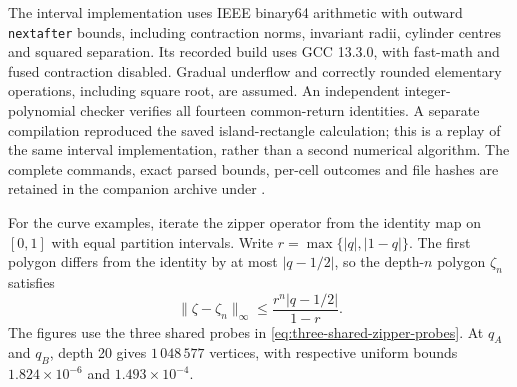The interval implementation uses IEEE binary64 arithmetic with outward
\texttt{nextafter} bounds, including contraction norms, invariant radii,
cylinder centres and squared separation. Its recorded build uses GCC
13.3.0, with fast-math and fused contraction disabled. Gradual underflow
and correctly rounded elementary operations, including square root, are
assumed. An independent integer-polynomial checker verifies all fourteen
common-return identities. A separate compilation reproduced the saved
island-rectangle calculation; this is a replay of the same interval
implementation, rather than a second numerical algorithm. The complete commands, exact parsed bounds, per-cell outcomes and file hashes are retained in the companion archive under
.

For the curve examples, iterate the zipper operator from the identity
map on $[0,1]$ with equal partition intervals. Write
$r=\max\{|q|,|1-q|\}$. The first polygon differs from the identity by at
most $|q-1/2|$, so the depth-$n$ polygon $\zeta_n$ satisfies
\[
 \|\zeta-\zeta_n\|_\infty
 \le \frac{r^n|q-1/2|}{1-r}.
\]
The figures use the three shared probes in
\eqref{eq:three-shared-zipper-probes}. At $q_A$ and $q_B$, depth 20
gives $1\,048\,577$ vertices, with respective uniform bounds
$1.824\times10^{-6}$ and $1.493\times10^{-4}$.

